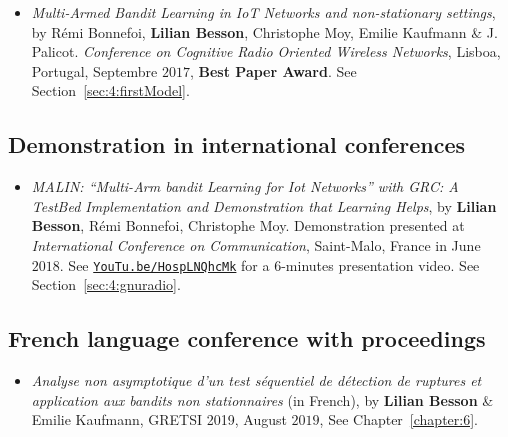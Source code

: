 \begin{itemize}
\item
    \emph{Multi-Armed Bandit Learning in IoT Networks and non-stationary settings},
    by Rémi Bonnefoi, \textbf{Lilian Besson}, Christophe Moy, Emilie Kaufmann \& J. Palicot.
    \emph{Conference on Cognitive Radio Oriented Wireless Networks},
    Lisboa, Portugal, Septembre $2017$,
    \textbf{Best Paper Award}.
    See Section~\ref{sec:4:firstModel}.
    \cite{Bonnefoi17}

\end{itemize}

\subsection*{Demonstration in international conferences}

\begin{itemize}

\item
    \emph{MALIN: ``Multi-Arm bandit Learning for Iot Networks'' with GRC: A TestBed Implementation and Demonstration that Learning Helps},
    by \textbf{Lilian Besson}, Rémi Bonnefoi, Christophe Moy.
    Demonstration presented at \emph{International Conference on Communication},
    Saint-Malo, France in June $2018$.
    See \href{https://YouTu.be/HospLNQhcMk}{\texttt{YouTu.be/HospLNQhcMk}} for a $6$-minutes presentation video.
    See Section~\ref{sec:4:gnuradio}.
    \cite{Besson2018ICT}

\end{itemize}


\subsection*{French language conference with proceedings}

\begin{itemize}
\item
    \emph{Analyse non asymptotique d'un test séquentiel de détection de ruptures et application aux bandits non stationnaires} (in French),
    by \textbf{Lilian Besson} \& Emilie Kaufmann,
    GRETSI 2019,
    August $2019$,
    See Chapter~\ref{chapter:6}.
    \cite{Besson2019Gretsi}

\end{itemize}


